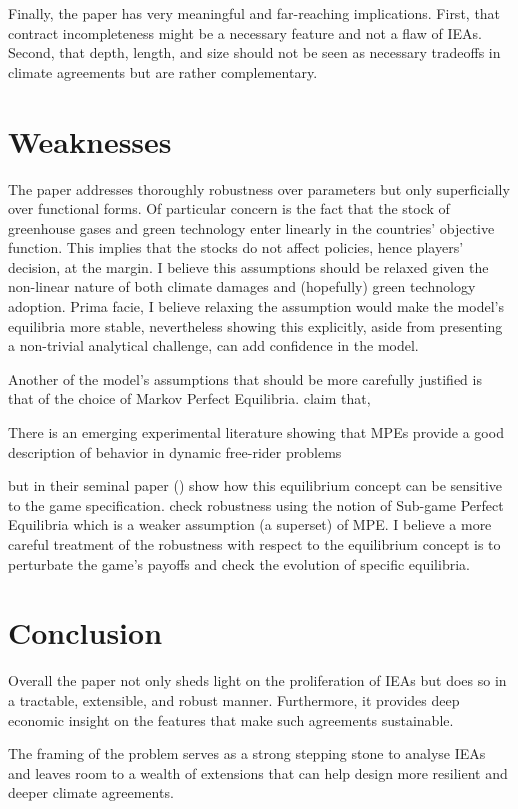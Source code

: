 \documentclass[american]{scrartcl}
\newcommand{\citein}[1]{\citeauthor{#1} (\citeyear{#1})}
\begin{document}
Finally, the paper has very meaningful and far-reaching implications. First, that contract incompleteness might be a necessary feature and not a flaw of IEAs. Second, that depth, length, and size should not be seen as necessary tradeoffs in climate agreements but are rather complementary.

\section{Weaknesses}

The paper addresses thoroughly robustness over parameters but only superficially over functional forms. Of particular concern is the fact that the stock of greenhouse gases and green technology enter linearly in the countries' objective function. This implies that the stocks do not affect policies, hence players' decision, at the margin. I believe this assumptions should be relaxed given the non-linear nature of both climate damages and (hopefully) green technology adoption. Prima facie, I believe relaxing the assumption would make the model's equilibria more stable, nevertheless showing this explicitly, aside from presenting a non-trivial analytical challenge, can add confidence in the model.

Another of the model's assumptions that should be more carefully justified is that of the choice of Markov Perfect Equilibria. \citeauthor{Battaglini2016} claim that,

\begin{displayquote}[p. 169][]
    There is an emerging experimental literature showing that MPEs provide a good description of behavior in dynamic free-rider problems
\end{displayquote}

but in their seminal paper \citein{Maskin1988} show how this equilibrium concept can be sensitive to the game specification. \citeauthor{Battaglini2016} check robustness using the notion of Sub-game Perfect Equilibria which is a weaker assumption (a superset) of MPE. I believe a more careful treatment of the robustness with respect to the equilibrium concept is to perturbate the game's payoffs and check the evolution of specific equilibria.

\section{Conclusion}

Overall the paper not only sheds light on the proliferation of IEAs but does so in a tractable, extensible, and robust manner. Furthermore, it provides deep economic insight on the features that make such agreements sustainable.

The framing of the problem serves as a strong stepping stone to analyse IEAs and leaves room to a wealth of extensions that can help design more resilient and deeper climate agreements.

\newpage
\nocite{*}
\printbibliography
\end{document}
